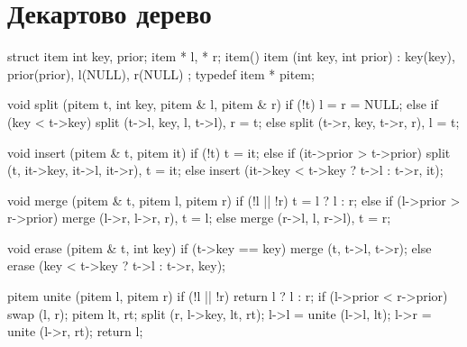 \documentclass[12pt, titlepage]{article}
\begin{document}
\section{Декартово дерево}
\begin{cppcode}
struct item {
    int key, prior;
    item * l, * r;
    item() { }
    item (int key, int prior) : key(key), prior(prior), l(NULL), r(NULL) { }
};
typedef item * pitem;

void split (pitem t, int key, pitem & l, pitem & r) {
    if (!t)
        l = r = NULL;
    else if (key < t->key)
        split (t->l, key, l, t->l),  r = t;
    else
        split (t->r, key, t->r, r),  l = t;
}

void insert (pitem & t, pitem it) {
    if (!t)
        t = it;
    else if (it->prior > t->prior)
        split (t, it->key, it->l, it->r),  t = it;
    else
        insert (it->key < t->key ? t->l : t->r, it);
}

void merge (pitem & t, pitem l, pitem r) {
    if (!l || !r)
        t = l ? l : r;
    else if (l->prior > r->prior)
        merge (l->r, l->r, r),  t = l;
    else
        merge (r->l, l, r->l),  t = r;
}

void erase (pitem & t, int key) {
    if (t->key == key)
        merge (t, t->l, t->r);
    else
        erase (key < t->key ? t->l : t->r, key);
}

pitem unite (pitem l, pitem r) {
    if (!l || !r)  return l ? l : r;
    if (l->prior < r->prior)  swap (l, r);
    pitem lt, rt;
    split (r, l->key, lt, rt);
    l->l = unite (l->l, lt);
    l->r = unite (l->r, rt);
    return l;
}
\end{cppcode}
\end{document}
